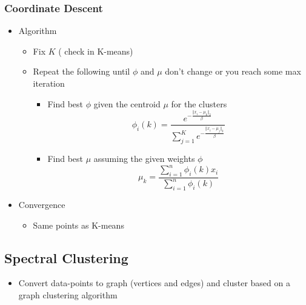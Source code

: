 \documentclass{article}
\begin{document}
\subsubsection{Coordinate Descent}
\begin{itemize}
    \item Algorithm
        \begin{itemize}
            \item Fix $K$ ( check in K-means)
            \item Repeat the following until $\phi$ and $\mu$ don't change or you reach some max iteration
            \begin{itemize}
                \item Find best $\phi$ given the centroid $\mu$ for the clusters
                    $$\phi_i(k) = \frac{ e^{-\frac{\Vert x_i-\mu_k \Vert_2}{\beta} } } { \sum_{j=1}^K e^{-\frac{\Vert x_i-\mu_j \Vert_2}{\beta}} }$$
                \item Find best $\mu$ assuming the given weights $\phi$
                    $$\mu_k = \frac{\sum_{i=1}^n \phi_i(k) x_i}{\sum_{i=1}^n \phi_i(k)}$$
            \end{itemize}
        \end{itemize}
    \item Convergence
        \begin{itemize}
            \item Same points as K-means 
        \end{itemize}
\end{itemize}


\subsection{Spectral Clustering}
\begin{itemize}
    \item Convert data-points to graph (vertices and edges) and cluster based on a graph clustering algorithm
\end{itemize}
\end{document}
